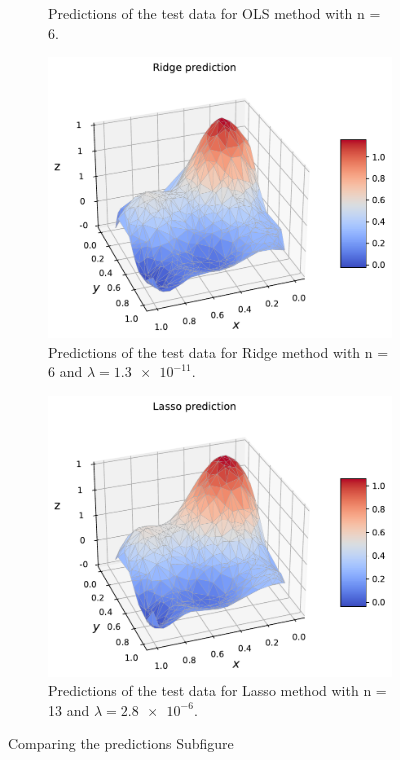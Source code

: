 \documentclass[norsk,a4paper,12pt]{scrartcl}
\begin{document}
\begin{figure}[H]
\begin{subfigure}[b]{0.49\textwidth}
        \caption{Predictions of the test data for OLS method with n = 6.}
    \label{fig:OLS_test_predict}
     \end{subfigure}
    \begin{subfigure}[b]{0.49\textwidth}
         \centering
         \includegraphics[width=\textwidth]{figures/Franke_Ridge_predict.pdf}
          \caption{Predictions of the test data for Ridge method with n = 6 and $\lambda =  \num{1.3e-11}$. }
          \label{fig:Ridge_test_predict}
     \end{subfigure}
     \hfill
     \begin{subfigure}[b]{0.49\textwidth}
         \centering
         \includegraphics[width=\textwidth]{figures/Franke_Lasso_predict.pdf}
         \caption{Predictions of the test data for Lasso method with n = 13 and $\lambda =\num{2.8e-6}$.   }
        \label{fig:Lasso_test_predict}
     \end{subfigure}
    \caption{Comparing the predictions Subfigure}
    \label{fig:franke_hyper_pred}
\end{figure}
\end{document}
